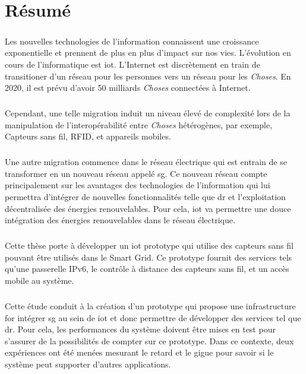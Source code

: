 \documentclass[oneside,12pt,a4paper,final]{book}
\begin{document}
\chapter*{Résumé}
\paragraph{}
Les nouvelles technologies de l'information connaissent une croissance exponentielle et prennent de plus en plus d'impact sur nos vies. L'évolution en cours de l'informatique est \gls{iot}. L'Internet est discrètement en train de transitioner d'un réseau pour les personnes vers un réseau pour les \textit{Choses}. En 2020, il est prévu d'avoir 50 milliards \textit{Choses} connectées à Internet.
\paragraph{}
Cependant, une telle migration induit un niveau élevé de complexité lors de la manipulation de l'interopérabilité entre \textit{Choses} hétérogènes, par exemple, Capteurs sans fil, RFID, et appareils mobiles.
\paragraph{}
Une autre migration commence dans le réseau électrique qui est entrain de se transformer en un nouveau réseau appelé \gls{sg}. Ce nouveau réseau compte principalement sur les avantages des technologies de l'information qui lui permettra d'intégrer de nouvelles fonctionnalités telle que \gls{dr} et l'exploitation décentralisée des énergies renouvelables. Pour cela, \gls{iot} va permettre une douce intégration des énergies renouvelables dans le réseau électrique.
\paragraph{} 
Cette thèse porte à développer un \gls{iot} prototype qui utilise des capteurs sans fil pouvant être utilisés dans le Smart Grid. Ce prototype fournit des services tels qu'une passerelle IPv6, le contrôle à distance des capteurs sans fil, et un accès mobile au système.
\paragraph{}
Cette étude conduit à la création d'un prototype qui propose une infrastructure for intégrer \gls{sg} au sein de \gls{iot} et donc permettre de développer des services tel que \gls{dr}. Pour cela, les performances du système doivent être mises en test pour s'assurer de la possibilités de compter sur ce prototype. Dans ce contexte, deux expériences ont été menées mesurant le retard et le gigue pour savoir si le système peut supporter d'autres applications.
\end{document}
